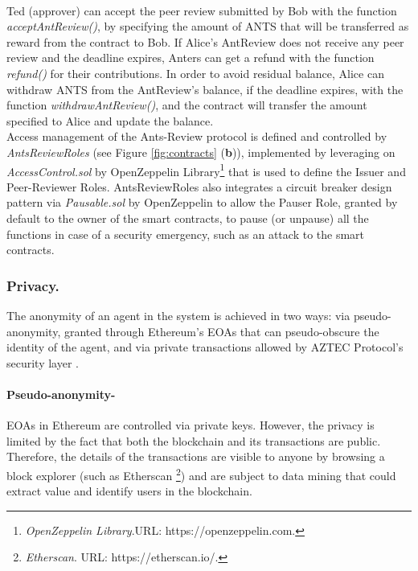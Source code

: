 \documentclass[runningheads]{llncs}
\begin{document}
\\
Ted (approver) can accept the peer review submitted by Bob with the function \emph{acceptAntReview()}, by specifying the amount of ANTS that will be transferred as reward from the contract to Bob.
If Alice's AntReview does not receive any peer review and the deadline expires, Anters can get a refund with the function \emph{refund()} for their contributions. In order to avoid residual balance, Alice can withdraw ANTS from the AntReview's balance, if the deadline expires, with the function \emph{withdrawAntReview()}, and the contract will transfer the amount specified to Alice and update the balance.
\\
Access management of the Ants-Review protocol is defined and controlled by \emph{AntsReviewRoles} (see Figure \ref{fig:contracts} (\textbf{b})), implemented by leveraging on \emph{AccessControl.sol} by OpenZeppelin Library\footnote[10]{\emph{OpenZeppelin Library}.\textsc{URL:} https://openzeppelin.com.} that is used to define the Issuer and Peer-Reviewer Roles. AntsReviewRoles also integrates a circuit breaker design pattern via \emph{Pausable.sol} by OpenZeppelin to allow the Pauser Role, granted by default to the owner of the smart contracts, to pause (or unpause) all the functions in case of a security emergency, such as an attack to the smart contracts.

\subsubsection{Privacy.}
The anonymity of an agent in the system is achieved in two ways: via pseudo-anonymity, granted through Ethereum's EOAs that can pseudo-obscure the identity of the agent, and via private transactions allowed by AZTEC Protocol's security layer \cite{AZTEC}.

\paragraph{\textbf{Pseudo-anonymity}-}EOAs in Ethereum are controlled via private keys. However, the privacy is limited by the fact that both the blockchain and its transactions are public.  Therefore, the details of the transactions are visible to anyone by browsing a block explorer (such as Etherscan \footnote[11]{\emph{Etherscan}. \textsc{URL:} https://etherscan.io/.}) and are subject to data mining that could extract value and identify users in the blockchain.
\end{document}
